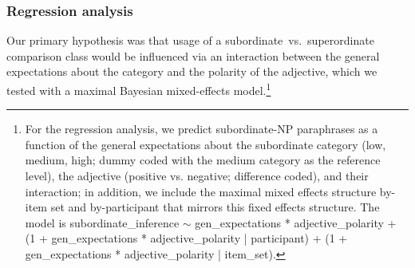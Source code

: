 \documentclass[doc]{apa6}
\newcommand{\red}[1]{\textcolor{Red}{#1}}
\newcommand{\mht}[1]{\textcolor{Blue}{[mht: #1]}}
\begin{document}


\subsubsection{Regression analysis}

Our primary hypothesis was that usage of a subordinate~vs.~superordinate comparison class would be influenced via an interaction between the general expectations about the category and the polarity of the adjective, which we tested with a maximal Bayesian mixed-effects model.\footnote{
	For the regression analysis, we predict subordinate-NP paraphrases as a function of the general expectations about the subordinate category (low, medium, high; dummy coded with the medium category as the reference level), the adjective (positive vs. negative; difference coded), and their interaction; in addition, we include the maximal mixed effects structure by-item set and by-participant that mirrors this fixed effects structure. The model is subordinate\_inference $\sim$ gen\_expectations * adjective\_polarity + (1 + gen\_expectations * adjective\_polarity | participant) + (1 + gen\_expectations * adjective\_polarity | item\_set).
}
\end{document}
